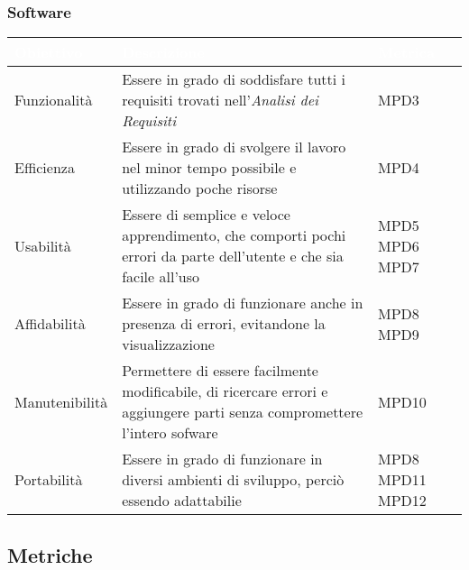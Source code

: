 \subsubsection{Software}
\begin{center}
  \renewcommand{\arraystretch}{1.25}
  \begin{longtable}{|p{3cm}|p{7.5cm}|p{2cm}|} \hline
    \rowcolor[HTML]{036400}
    \textcolor{white}{\textbf{Obiettivo}} & \textcolor{white}{\textbf{Descrizione}} & \textcolor{white}{\textbf{Metrica}}  \\ \hline
    \rowcolor[HTML]{EFEFEF}
    Funzionalità & Essere in grado di soddisfare tutti i requisiti trovati nell'\textit{Analisi dei Requisiti}  & MPD3       \\ \hline
    \rowcolor[HTML]{C0C0C0}
    Efficienza & Essere in grado di svolgere il lavoro nel minor tempo possibile e utilizzando poche risorse   & MPD4       \\ \hline
    \rowcolor[HTML]{EFEFEF}
    Usabilità & Essere di semplice e veloce apprendimento, che comporti pochi errori da parte dell'utente e che sia facile all'uso  & MPD5 \newline MPD6 \newline MPD7    \\ \hline
    \rowcolor[HTML]{C0C0C0}
    Affidabilità & Essere in grado di funzionare anche in presenza di errori, evitandone la visualizzazione  & MPD8 \newline MPD9       \\ \hline
    \rowcolor[HTML]{EFEFEF}
    Manutenibilità & Permettere di essere facilmente modificabile, di ricercare errori e aggiungere parti senza compromettere l'intero sofware  & MPD10       \\ \hline
    \rowcolor[HTML]{C0C0C0}
    Portabilità & Essere in grado di funzionare in diversi ambienti di sviluppo, perciò essendo adattabilie & MPD8 \newline MPD11 \newline MPD12       \\ \hline
  \end{longtable}
\end{center}


\subsection{Metriche}
